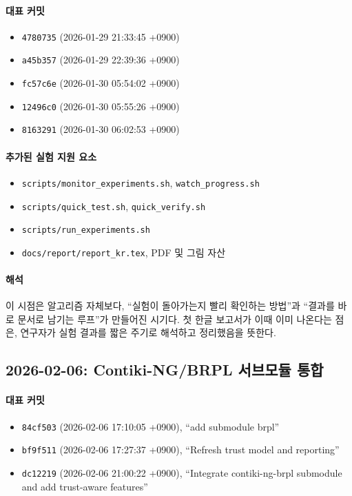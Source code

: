 \documentclass[12pt,a4paper]{article}
\begin{document}
\paragraph{대표 커밋}
\begin{itemize}[leftmargin=1.5em]
\item \texttt{4780735} (2026-01-29 21:33:45 +0900)
\item \texttt{a45b357} (2026-01-29 22:39:36 +0900)
\item \texttt{fc57c6e} (2026-01-30 05:54:02 +0900)
\item \texttt{12496c0} (2026-01-30 05:55:26 +0900)
\item \texttt{8163291} (2026-01-30 06:02:53 +0900)
\end{itemize}

\paragraph{추가된 실험 지원 요소}
\begin{itemize}[leftmargin=1.5em]
\item \texttt{scripts/monitor\_experiments.sh}, \texttt{watch\_progress.sh}
\item \texttt{scripts/quick\_test.sh}, \texttt{quick\_verify.sh}
\item \texttt{scripts/run\_experiments.sh}
\item \texttt{docs/report/report\_kr.tex}, PDF 및 그림 자산
\end{itemize}

\paragraph{해석}
이 시점은 알고리즘 자체보다, ``실험이 돌아가는지 빨리 확인하는 방법''과
``결과를 바로 문서로 남기는 루프''가 만들어진 시기다. 첫 한글 보고서가 이때
이미 나온다는 점은, 연구자가 실험 결과를 짧은 주기로 해석하고 정리했음을 뜻한다.

\subsection{2026-02-06: Contiki-NG/BRPL 서브모듈 통합}

\paragraph{대표 커밋}
\begin{itemize}[leftmargin=1.5em]
\item \texttt{84cf503} (2026-02-06 17:10:05 +0900), ``add submodule brpl''
\item \texttt{bf9f511} (2026-02-06 17:27:37 +0900), ``Refresh trust model and reporting''
\item \texttt{dc12219} (2026-02-06 21:00:22 +0900), ``Integrate contiki-ng-brpl submodule and add trust-aware features''
\end{itemize}
\end{document}
